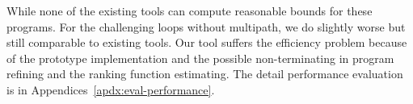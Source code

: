 While none of the existing tools can compute reasonable bounds for these programs.
For the challenging loops without multipath, we do slightly worse but still comparable to existing tools.
Our tool suffers the efficiency problem because of the prototype implementation and the possible non-terminating in program refining and the ranking function estimating.
The detail performance evaluation is in Appendices~\ref{apdx:eval-performance}.
